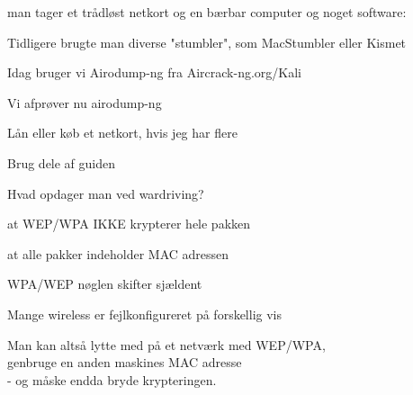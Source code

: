 \documentclass[Screen16to9,17pt]{foils}
\begin{document}




\begin{list1}
\item man tager et trådløst netkort og en bærbar computer og noget software:
\begin{list2}
\item Tidligere brugte man diverse "stumbler", som MacStumbler eller Kismet
\item Idag bruger vi Airodump-ng fra Aircrack-ng.org/Kali
  \end{list2}
\end{list1}



\begin{list1}
\item Vi afprøver nu airodump-ng
\item Lån eller køb et netkort, hvis jeg har flere
\item Brug dele af guiden\\ 
\end{list1}




\begin{list1}
\item Hvad opdager man ved wardriving?
\begin{list2}
\item at WEP/WPA IKKE krypterer hele pakken
\item at alle pakker indeholder MAC adressen
\item WPA/WEP nøglen skifter sjældent
\item Mange wireless er fejlkonfigureret på forskellig vis
\end{list2}
\item {\color{red}
Man kan altså lytte med på et netværk med WEP/WPA, \\
genbruge en anden maskines MAC adresse \\
- og måske endda bryde krypteringen.}
\end{list1}
\end{document}
